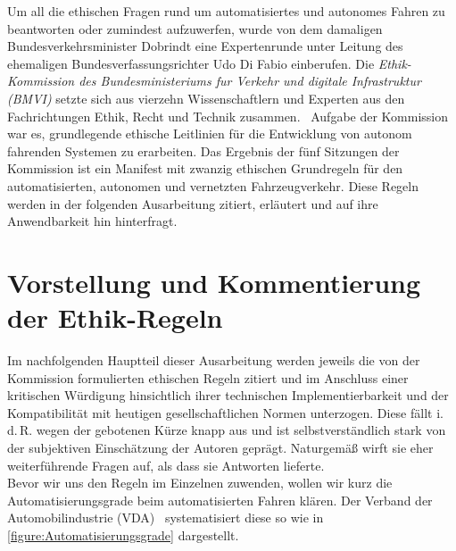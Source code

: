 \documentclass[twoside,a4paper,12pt]{article}
\begin{document}
Um all die ethischen Fragen rund um automatisiertes und autonomes Fahren zu beantworten oder zumindest aufzuwerfen, wurde von dem damaligen Bundesverkehrsminister Dobrindt eine Expertenrunde unter Leitung des ehemaligen Bundesverfassungsrichter Udo Di Fabio einberufen. Die \textit{Ethik-Kommission
des Bundesministeriums fur Verkehr und digitale Infrastruktur (BMVI)} setzte sich aus vierzehn Wissenschaftlern und Experten aus den Fachrichtungen Ethik, Recht und Technik zusammen.~\cite{bmvi1} Aufgabe der Kommission war es, grundlegende ethische Leitlinien für die Entwicklung von autonom fahrenden Systemen zu
erarbeiten. Das Ergebnis der fünf Sitzungen der Kommission ist ein Manifest mit zwanzig ethischen Grundregeln für den automatisierten, autonomen und vernetzten Fahrzeugverkehr. Diese Regeln werden in der folgenden Ausarbeitung zitiert, erläutert und auf ihre Anwendbarkeit hin hinterfragt. 

\newpage

\tableofcontents


\listoffigures

\newpage

\mainmatter

\cleardoublepage
\section{Vorstellung und Kommentierung der Ethik-Regeln} \label{VorstellungUndKommentierungDerEthikRegeln}

Im nachfolgenden Hauptteil dieser Ausarbeitung werden jeweils die von der Kommission formulierten ethischen Regeln zitiert und im Anschluss einer kritischen 
Würdigung hinsichtlich ihrer technischen Implementierbarkeit und der Kompatibilität mit heutigen gesellschaftlichen Normen unterzogen. 
Diese fällt i.\,d.\,R. wegen der gebotenen Kürze knapp aus und ist selbstverständlich
stark von der subjektiven Einschätzung der Autoren geprägt. Naturgemäß wirft sie eher weiterführende Fragen auf, als dass sie Antworten lieferte.\\

Bevor wir uns den Regeln im Einzelnen zuwenden, wollen wir kurz die Automatisierungsgrade beim automatisierten Fahren klären. Der Verband der 
Automobilindustrie (VDA)~\cite{vda} systematisiert diese so wie in \autoref{figure:Automatisierungsgrade} dargestellt.\\
\end{document}
